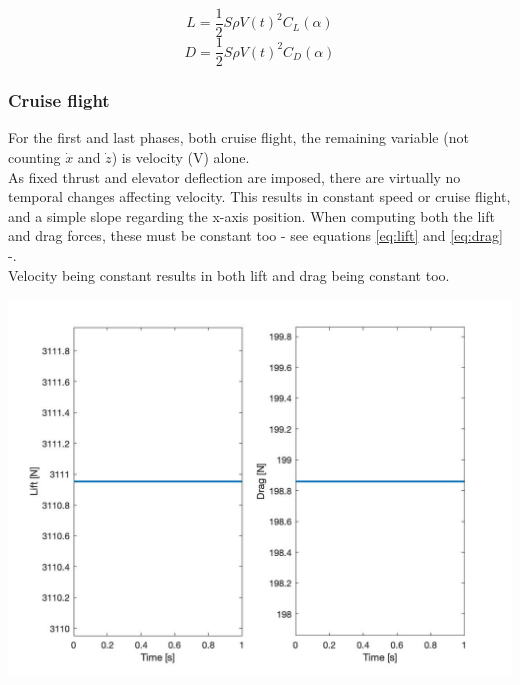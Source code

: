 \begin{equation} \label{eq:lift}
	L=\frac{1}{2}S\rho V(t)^2 C_L(\alpha)
\end{equation}
\begin{equation} \label{eq:drag}
	D=\frac{1}{2}S\rho V(t)^2 C_D(\alpha)
\end{equation}

\subsubsection*{Cruise flight}
For the first and last phases, both cruise flight, the remaining variable (not counting $\Dot{x}$ and $\Dot{z}$) is velocity (V) alone.\\
As fixed thrust and elevator deflection are imposed, there are virtually no temporal changes affecting velocity. This results in constant speed or cruise flight, and a simple slope regarding the x-axis position. When computing both the lift and drag forces, these must be constant too - see equations \ref{eq:lift} and \ref{eq:drag} -.\\

Velocity being constant results in both lift and drag being constant too.
\begin{center}
	\includegraphics[width=\linewidth]{../matlab/1/liftdrag.jpg}
	\vspace{0.5cm}
	\vspace{0.25cm}
\end{center}


